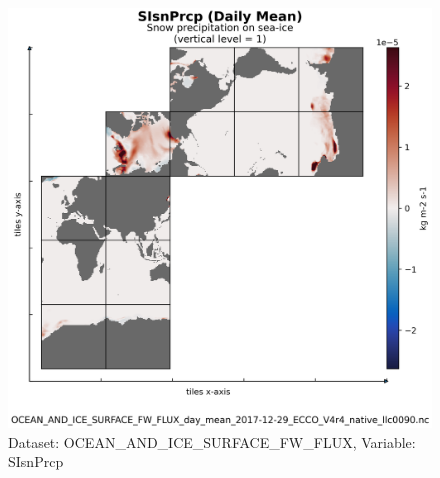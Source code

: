 \begin{figure}[H]
\centering
\includegraphics[scale=0.55]{../images/plots/native_plots/Ocean_and_Sea-Ice_Surface_Freshwater_Fluxes/SIsnPrcp.png}
\caption{Dataset: OCEAN\_AND\_ICE\_SURFACE\_FW\_FLUX, Variable: SIsnPrcp}
\label{tab:table-OCEAN_AND_ICE_SURFACE_FW_FLUX_SIsnPrcp-Plot}
\end{figure}
\newpage
\pagebreak
